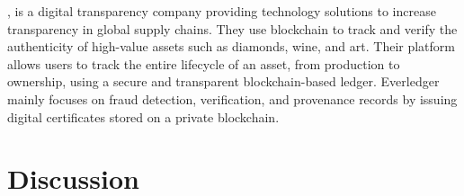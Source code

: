 \textcite{everledger}, is a digital transparency company providing technology solutions to increase transparency in global supply chains. They use blockchain to track and verify the authenticity of high-value assets such as diamonds, wine, and art. Their platform allows users to track the entire lifecycle of an asset, from production to ownership, using a secure and transparent blockchain-based ledger. Everledger mainly focuses on fraud detection, verification, and provenance records by issuing digital certificates stored on a private blockchain.

\section{Discussion}
